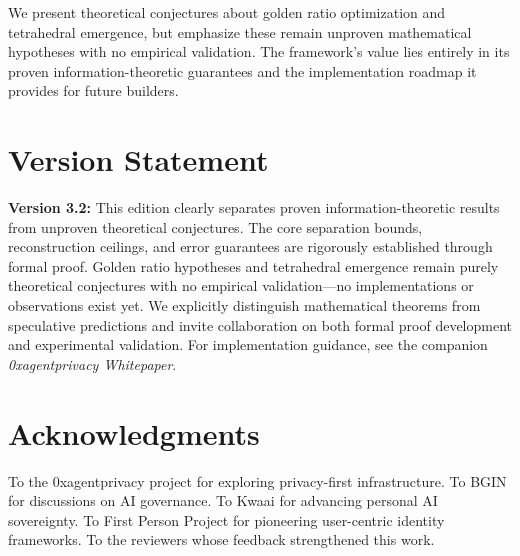 \documentclass[11pt,a4paper]{article}
\theoremstyle{definition}
\begin{document}
We present theoretical conjectures about golden ratio optimization and tetrahedral emergence, but emphasize these remain unproven mathematical hypotheses with no empirical validation. The framework's value lies entirely in its proven information-theoretic guarantees and the implementation roadmap it provides for future builders.

\section*{Version Statement}

\textbf{Version 3.2:} This edition clearly separates proven information-theoretic results from unproven theoretical conjectures. The core separation bounds, reconstruction ceilings, and error guarantees are rigorously established through formal proof. Golden ratio hypotheses and tetrahedral emergence remain purely theoretical conjectures with no empirical validation---no implementations or observations exist yet. We explicitly distinguish mathematical theorems from speculative predictions and invite collaboration on both formal proof development and experimental validation. For implementation guidance, see the companion \textit{0xagentprivacy Whitepaper}.

\section*{Acknowledgments}

To the 0xagentprivacy project for exploring privacy-first infrastructure. To BGIN for discussions on AI governance. To Kwaai for advancing personal AI sovereignty. To First Person Project for pioneering user-centric identity frameworks. To the reviewers whose feedback strengthened this work.
\end{document}
